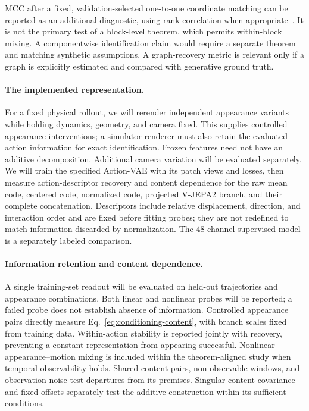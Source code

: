 MCC after a fixed, validation-selected one-to-one coordinate matching
can be reported as an additional diagnostic, using rank correlation
when appropriate~\citep{yao2022leap}. It is not the primary test of a
block-level theorem, which permits within-block mixing.
A componentwise identification claim would require a separate theorem
and matching synthetic assumptions. A graph-recovery metric is relevant
only if a graph is explicitly estimated and compared with generative
ground truth.

\paragraph{The implemented representation.}
For a fixed physical rollout, we will rerender independent appearance
variants while holding dynamics, geometry, and camera fixed.
This supplies controlled appearance interventions; a simulator renderer
must also retain the evaluated action information for exact identification.
Frozen features need not have an additive decomposition.
Additional camera variation will be evaluated separately.
We will train the specified Action-VAE with its patch views and losses,
then measure action-descriptor recovery and content dependence for
the raw mean code, centered code, normalized code, projected V-JEPA2
branch, and their complete concatenation.
Descriptors include relative displacement, direction, and interaction
order and are fixed before fitting probes; they are not redefined to
match information discarded by normalization.
The 48-channel supervised model is a separately labeled comparison.

\paragraph{Information retention and content dependence.}
A single training-set readout will be evaluated on held-out trajectories
and appearance combinations. Both linear and nonlinear probes will be
reported; a failed probe does not establish absence of information.
Controlled appearance pairs directly measure
Eq.~\ref{eq:conditioning-content}, with branch scales fixed from training
data. Within-action stability is reported jointly with recovery,
preventing a constant representation from appearing successful.
Nonlinear appearance--motion mixing is included within the theorem-aligned
study when temporal observability holds. Shared-content pairs,
non-observable windows, and observation noise test departures from its
premises. Singular content covariance and fixed offsets separately test
the additive construction within its sufficient conditions.

